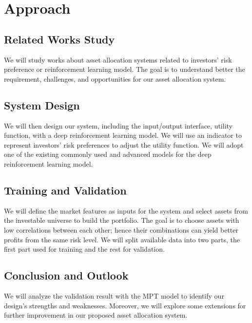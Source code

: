 \chapter{Approach}
\section{Related Works Study}
We will study works about asset allocation systems related to investors' risk preference or reinforcement learning model. The goal is to understand better the requirement, challenges, and opportunities for our asset allocation system.
\section{System Design}
We will then design our system, including the input/output interface, utility function, with a deep reinforcement learning model. We will use an indicator to represent investors' risk preferences to adjust the utility function. We will adopt one of the existing commonly used and advanced models for the deep reinforcement learning model.
\section{Training and Validation}
We will define the market features as inputs for the system and select assets from the investable universe to build the portfolio. The goal is to choose assets with low correlations between each other; hence their combinations can yield better profits from the same risk level. We will split available data into two parts, the first part used for training and the rest for validation. 
\section{Conclusion and Outlook}
We will analyze the validation result with the MPT model to identify our design's strengths and weaknesses. Moreover, we will explore some extensions for further improvement in our proposed asset allocation system.

